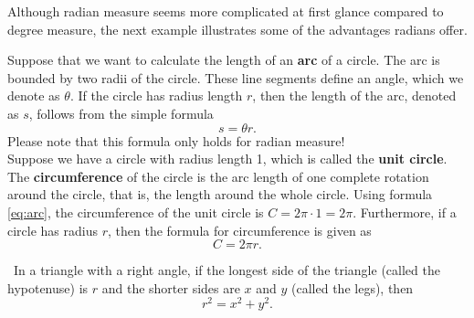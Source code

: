 \documentclass{book}
\begin{document}
Although radian measure seems more complicated at first glance compared to degree measure, the next example illustrates some of the advantages radians offer.

\begin{Exam} Suppose that we want to calculate the length of an \textbf{arc} of a circle. The arc is bounded by two radii of the circle. These line segments define an angle, which we denote as $\theta$. If the circle has radius length $r$, then the length of the arc, denoted as $s$, follows from the simple formula
\begin{equation}\label{eq:arc}  s = \theta r.\end{equation} Please note that this formula only holds for radian measure!\\

Suppose we have a circle with radius length 1, which is called the \textbf{unit circle}. The \textbf{circumference} of the circle is the arc length of one complete rotation around the circle, that is, the length around the whole circle. Using formula \eqref{eq:arc}, the circumference of the unit circle is $C = 2\pi\cdot 1 = 2\pi$. Furthermore, if  a circle has radius $r$, then the formula for circumference is given as \begin{equation} C = 2\pi r.\end{equation}
\end{Exam}\vs

\begin{Thm}\hspace{- 5 pt}\footnotemark\ In a triangle with a right angle, if the longest side of the triangle (called the hypotenuse) is $r$ and the shorter sides are $x$ and $y$ (called the legs), then \[r^2 = x^2 + y^2.\] \end{Thm}\vs
\end{document}
